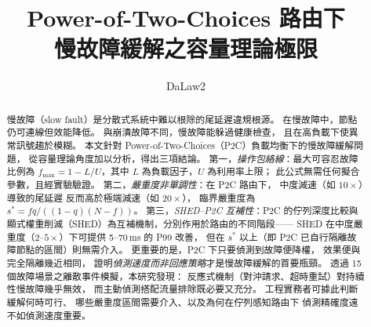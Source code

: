 \documentclass[11pt]{article}
\newcommand{\fmax}{f_{\max}}
\newcommand{\sstar}{s^{*}}
\begin{document}
\title{Power-of-Two-Choices 路由下\\慢故障緩解之容量理論極限}
\author{DaLaw2}
\date{}
\maketitle

\begin{abstract}
慢故障（slow fault）是分散式系統中難以根除的尾延遲違規根源。
在慢故障中，節點仍可連線但效能降低。
與崩潰故障不同，慢故障能躲過健康檢查，
且在高負載下使異常訊號趨於模糊。
本文針對 Power-of-Two-Choices（P2C）負載均衡下的慢故障緩解問題，
從容量理論角度加以分析，得出三項結論。
第一，\emph{操作包絡線}：最大可容忍故障比例為
$\fmax = 1 - L/U$，其中 $L$ 為負載因子，$U$ 為利用率上限；
此公式無需任何擬合參數，且經實驗驗證。
第二，\emph{嚴重度非單調性}：在 P2C 路由下，
中度減速（如 $10\times$）導致的尾延遲
反而高於極端減速（如 $20\times$），
臨界嚴重度為 $\sstar = fq/((1-q)(N-f))$。
第三，\emph{SHED--P2C 互補性}：P2C 的佇列深度比較與
顯式權重削減（SHED）為互補機制，分別作用於路由的不同階段——
SHED 在中度嚴重度（$2$--$5\times$）下可提供 5--70\,ms 的 P99 改善，
但在 $\sstar$ 以上（即 P2C 已自行隔離故障節點的區間）則無需介入。
更重要的是，P2C 下只要偵測到故障便降權，
效果便與完全隔離幾近相同，
證明\emph{偵測速度而非回應策略}才是慢故障緩解的首要瓶頸。
透過 15 個故障場景之離散事件模擬，本研究發現：
反應式機制（對沖請求、超時重試）對持續性慢故障幾乎無效，
而主動偵測搭配流量排除既必要又充分。
工程實務者可據此判斷緩解何時可行、
哪些嚴重度區間需要介入、以及為何在佇列感知路由下
偵測精確度遠不如偵測速度重要。
\end{abstract}












\end{document}
